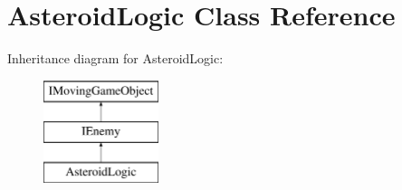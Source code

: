 \hypertarget{class_asteroid_logic}{}\section{Asteroid\+Logic Class Reference}
\label{class_asteroid_logic}
Inheritance diagram for Asteroid\+Logic\+:\begin{figure}[H]
\begin{center}
\leavevmode
\includegraphics[height=3.000000cm]{class_asteroid_logic}
\end{center}
\end{figure}
